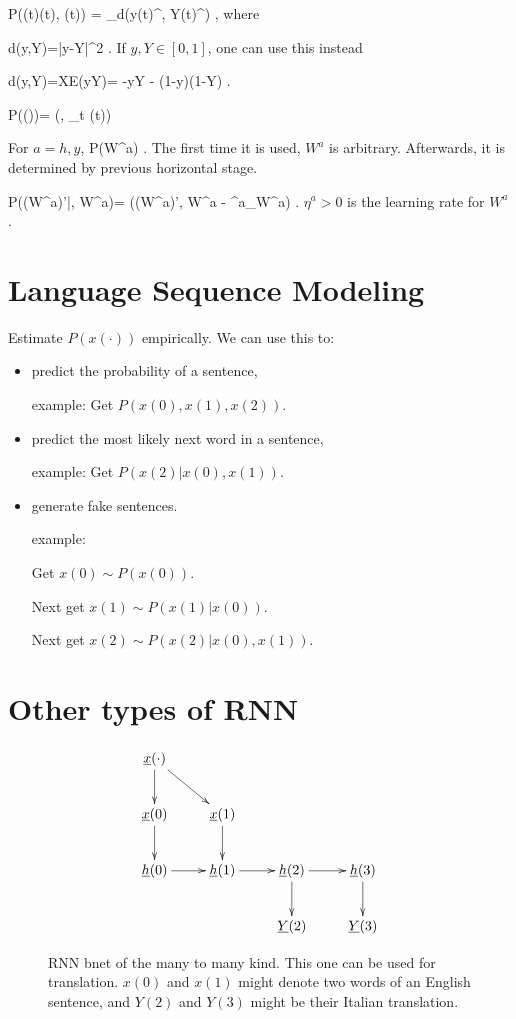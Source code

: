 \beq\color{blue}
P(\cale(t)\mid \vecy(t), (t))
=
\sum_\sigma d(y(t)^\s, Y(t)^\s)
\;,
\eeq
where 

\beq
d(y,Y)=|y-Y|^2
\;.
\label{eq-d-err-sq}
\eeq
If $y, Y\in [0,1]$, 
one can use this instead

\beq
d(y,Y)=XE(y\rarrow Y)=
-y\ln Y - (1-y)\ln (1-Y)
\;.
\eeq

\beq\color{blue}
P(\cale\mid \cale(\cdot))=
\delta(\cale, \sum_t \cale(t))
\eeq

For $a=h,y$,
\beq\color{blue}
P(W^a)
\;.
\eeq
The first time it is used,
$W^a$ is arbitrary. Afterwards,
it is determined by previous 
horizontal
stage.

\beq\color{blue}
P((W^a)'|\cale, W^a)=
\delta((W^a)', W^a -
\eta ^a\partial_{W^a}\cale)
\;.
\eeq
$\eta ^a>0$ is the learning rate
for $W^a$.

\section{Language Sequence Modeling}

Estimate $P(x(\cdot))$ 
empirically.
We can use this to: 
\begin{itemize}
\item
predict the probability 
of a sentence,

example: Get $P(x(0), x(1), x(2))$.
\item
predict 
the most likely 
next word in a sentence,

example: Get $P(x(2)| x(0), x(1))$.
\item generate fake sentences.

example: 

Get $x(0)\sim P(x(0))$.

Next get $x(1)\sim P(x(1)|x(0))$.

Next get $x(2)\sim P(x(2)|x(0), x(1))$.


\end{itemize}

 
\section{Other types of RNN}

\begin{figure}[h!]
\centering
$$\xymatrix{
\rvx(\cdot)\ar[d]\ar[dr]\\
\rvx(0)\ar[d]&
\rvx(1)\ar[d]&
\\
\rvh(0)\ar[r]&
\rvh(1)\ar[r]&
\rvh(2)\ar[d]\ar[r]&
\rvh(3)\ar[d]\\
&
&
\rvY(2)&
\rvY(3)
}$$
\caption{RNN bnet of the
many to many kind. This
one can be used for  translation.
$x(0)$ and $x(1)$ might
denote two words of an English
sentence, and $Y(2)$ 
and $Y(3)$ might be
their Italian translation.}
\label{fig-rnn-translation}
\end{figure}

